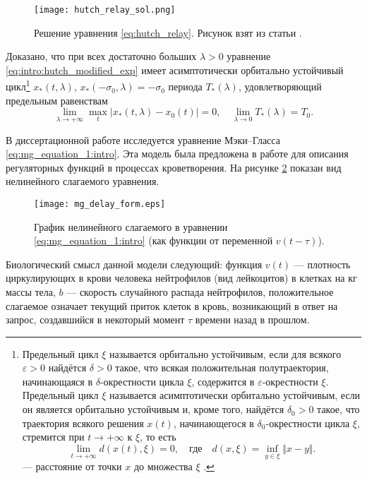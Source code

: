 \begin{figure}
	\centering
	\texttt{[image: hutch\_relay\_sol.png]}
	\caption{Решение уравнения \eqref{eq:hutch_relay}. Рисунок взят из статьи \cite{Kolesov2010}.}
	\label{fig:hutch_relax}
\end{figure}

Доказано, что при всех достаточно больших $\lambda > 0$ уравнение \eqref{eq:intro:hutch_modified_exp} имеет асимптотически орбитально  устойчивый цикл\footnote{Предельный цикл $\xi$ называется орбитально устойчивым, если для всякого $\varepsilon > 0$ найдётся $\delta > 0$ такое, что всякая положительная полутраектория, начинающаяся в $\delta$-окрестности цикла $\xi$, содержится в $\varepsilon$-окрестности $\xi$. Предельный цикл $\xi$ называется асимптотически орбитально устойчивым, если он является орбитально устойчивым и, кроме того, найдётся $\delta_0 > 0$ такое, что траектория всякого решения $x(t)$, начинающегося в $\delta_0$-окрестности цикла $\xi$, стремится при $t \to +\infty$ к $\xi$, то есть
\[
\lim\limits_{t\to +\infty} d(x(t), \xi) = 0, \quad \text{где} \quad d(x, \xi) = \inf_{y\in \xi} \Vert x - y \Vert.
\]
--- расстояние от точки $x$ до множества $\xi$ \cite{MathEncyclopedy1984}.} $x_*(t, \lambda)$, $x_*(-\sigma_0, \lambda) = -\sigma_0$ периода $T_*(\lambda)$, удовлетворяющий предельным равенствам
%
$$
\lim _{\lambda \rightarrow +\infty} \max_t \left|x_*(t, \lambda) - x_0(t)\right|=0, \quad \lim _{\lambda \rightarrow 0} T_*(\lambda) = T_0.
$$

В диссертационной работе исследуется уравнение Мэки--Гласса \eqref{eq:mg_equation_1:intro}. Эта модель была предложена в работе \cite{Mackey1977} для описания регуляторных функций в процессах кроветворения. На рисунке \ref{fig:mg_delay_form} показан вид нелинейного слагаемого уравнения.

\begin{figure}
	\centering
	\texttt{[image: mg\_delay\_form.eps]}
	\caption{График нелинейного слагаемого в уравнении \eqref{eq:mg_equation_1:intro} (как функции от переменной $v(t - \tau)$).
	}
	\label{fig:mg_delay_form}
\end{figure}

Биологический смысл данной модели следующий: функция $v(t)$ --- плотность циркулирующих в крови человека нейтрофилов (вид лейкоцитов) в клетках на кг массы тела, $b$ --- скорость случайного распада нейтрофилов, положительное слагаемое означает текущий приток клеток в кровь, возникающий в ответ на запрос, создавшийся в некоторый момент $\tau$ времени назад в прошлом.

